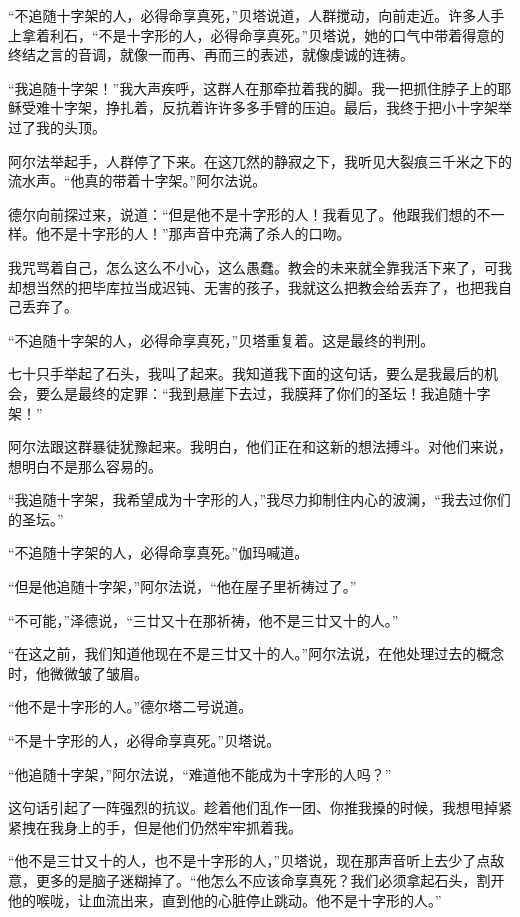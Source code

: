 \documentclass[AutoFakeBold=true]{book}
\begin{document}
``不追随十字架的人，必得命享真死，''贝塔说道，人群搅动，向前走近。许多人手上拿着利石，``不是十字形的人，必得命享真死。''贝塔说，她的口气中带着得意的终结之言的音调，就像一而再、再而三的表述，就像虔诚的连祷。

``我追随十字架！''我大声疾呼，这群人在那牵拉着我的脚。我一把抓住脖子上的耶稣受难十字架，挣扎着，反抗着许许多多手臂的压迫。最后，我终于把小十字架举过了我的头顶。

阿尔法举起手，人群停了下来。在这兀然的静寂之下，我听见大裂痕三千米之下的流水声。``他真的带着十字架。''阿尔法说。

德尔向前探过来，说道：``但是他不是十字形的人！我看见了。他跟我们想的不一样。他不是十字形的人！''那声音中充满了杀人的口吻。

我咒骂着自己，怎么这么不小心，这么愚蠢。教会的未来就全靠我活下来了，可我却想当然的把毕库拉当成迟钝、无害的孩子，我就这么把教会给丢弃了，也把我自己丢弃了。

``不追随十字架的人，必得命享真死，''贝塔重复着。这是最终的判刑。

七十只手举起了石头，我叫了起来。我知道我下面的这句话，要么是我最后的机会，要么是最终的定罪：``我到悬崖下去过，我膜拜了你们的圣坛！我追随十字架！''

阿尔法跟这群暴徒犹豫起来。我明白，他们正在和这新的想法搏斗。对他们来说，想明白不是那么容易的。

``我追随十字架，我希望成为十字形的人，''我尽力抑制住内心的波澜，``我去过你们的圣坛。''

``不追随十字架的人，必得命享真死。''伽玛喊道。

``但是他追随十字架，''阿尔法说，``他在屋子里祈祷过了。''

``不可能，''泽德说，``三廿又十在那祈祷，他不是三廿又十的人。''

``在这之前，我们知道他现在不是三廿又十的人。''阿尔法说，在他处理过去的概念时，他微微皱了皱眉。

``他不是十字形的人。''德尔塔二号说道。

``不是十字形的人，必得命享真死。''贝塔说。

``他追随十字架，''阿尔法说，``难道他不能成为十字形的人吗？''

这句话引起了一阵强烈的抗议。趁着他们乱作一团、你推我搡的时候，我想甩掉紧紧拽在我身上的手，但是他们仍然牢牢抓着我。

``他不是三廿又十的人，也不是十字形的人，''贝塔说，现在那声音听上去少了点敌意，更多的是脑子迷糊掉了。``他怎么不应该命享真死？我们必须拿起石头，割开他的喉咙，让血流出来，直到他的心脏停止跳动。他不是十字形的人。''
\end{document}
